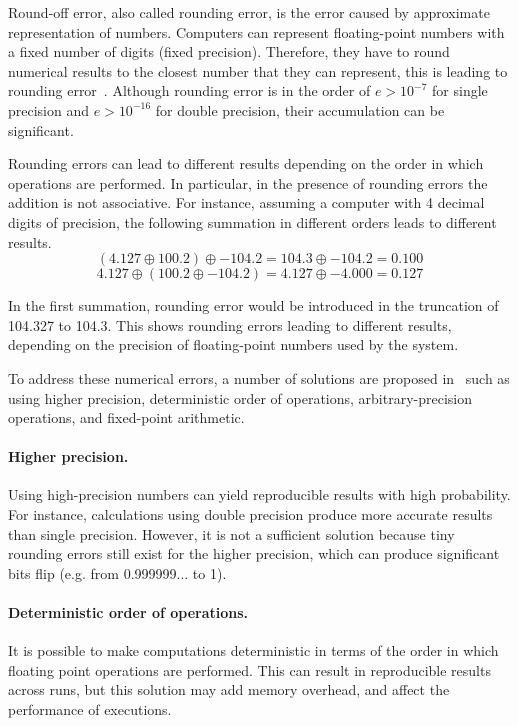 Round-off error, also called rounding error, is the error caused by 
approximate representation of numbers. Computers can represent 
floating-point numbers with a fixed number of digits (fixed precision). 
Therefore, they have to round numerical results to the closest number 
that they can represent, this is leading to rounding 
error~\cite{fadnavis1998some}. Although rounding error is in the order 
of $e>10^{-7}$ for single precision and $e>10^{-16}$ 
for double 
precision, their accumulation can be significant. 

Rounding errors can lead to different results depending on the order in 
which operations are performed. In particular, in the presence of 
rounding errors the addition is not associative. For instance, assuming 
a computer with 4 decimal digits of precision, the following summation 
in different orders leads to different results.
\[
(4.127 \oplus 100.2) \oplus -104.2 = 104.3 \oplus -104.2 = 0.100
\]
\[
4.127 \oplus (100.2 \oplus -104.2) = 4.127 \oplus -4.000 = 0.127
\]

In the first summation, rounding error would be introduced in the truncation of 104.327 to 104.3.
This shows rounding errors leading to different results, depending on the precision of floating-point numbers used by the system.

To address these numerical errors, a number of 
solutions are proposed in~\cite{muller2018reproducible} 
such as using higher precision, deterministic order of operations, 
arbitrary-precision operations, and fixed-point arithmetic.

\paragraph{Higher precision.} Using high-precision numbers can yield 
reproducible results with high probability. For instance, calculations 
using double precision produce more accurate results than single 
precision. 
However, it is not a sufficient solution because  
tiny rounding errors still exist for the higher precision, which can 
produce significant bits flip (e.g. from 0.999999... to 1). 

\paragraph{Deterministic order of operations.} It is possible to make 
computations deterministic in terms of the order in which floating 
point operations are performed. This can result in reproducible results 
across runs, but this solution may add memory overhead, and affect 
the performance of executions. 

